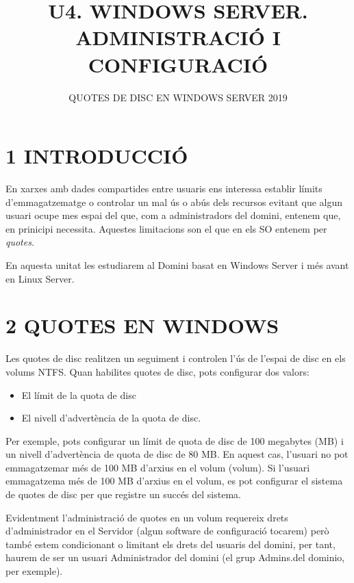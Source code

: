 \documentclass[
  a4paper,
]{article}
\title{U4. WINDOWS SERVER. ADMINISTRACIÓ I CONFIGURACIÓ}
\subtitle{QUOTES DE DISC EN WINDOWS SERVER 2019}
\author{}
\date{\vspace{-2.5em}}
\begin{document}
\maketitle

{
\setcounter{tocdepth}{2}
\tableofcontents
}
\renewcommand\tablename{Tabla}
\newpage

\section{1 INTRODUCCIÓ}\label{introducciuxf3}

En xarxes amb dades compartides entre usuaris ens interessa establir
límits d'emmagatzematge o controlar un mal ús o abús dels recursos
evitant que algun usuari ocupe mes espai del que, com a administradors
del domini, entenem que, en prinicipi necessita. Aquestes limitacions
son el que en els SO entenem per \emph{quotes}.

En aquesta unitat les estudiarem al Domini basat en Windows Server i més
avant en Linux Server.

\section{2 QUOTES EN WINDOWS}\label{quotes-en-windows}

Les quotes de disc realitzen un seguiment i controlen l'ús de l'espai de
disc en els volums NTFS. Quan habilites quotes de disc, pots configurar
dos valors:

\begin{itemize}
\item
  El límit de la quota de disc
\item
  El nivell d'advertència de la quota de disc.
\end{itemize}

Per exemple, pots configurar un límit de quota de disc de 100 megabytes
(MB) i un nivell d'advertència de quota de disc de 80 MB. En aquest cas,
l'usuari no pot emmagatzemar més de 100 MB d'arxius en el volum (volum).
Si l'usuari emmagatzema més de 100 MB d'arxius en el volum, es pot
configurar el sistema de quotes de disc per que registre un succés del
sistema.

Evidentment l'administració de quotes en un volum requereix drets
d'administrador en el Servidor (algun software de configuració tocarem)
però també estem condicionant o limitant els drets del usuaris del
domini, per tant, haurem de ser un usuari Administrador del domini (el
grup Admins.del dominio, per exemple).
\end{document}
